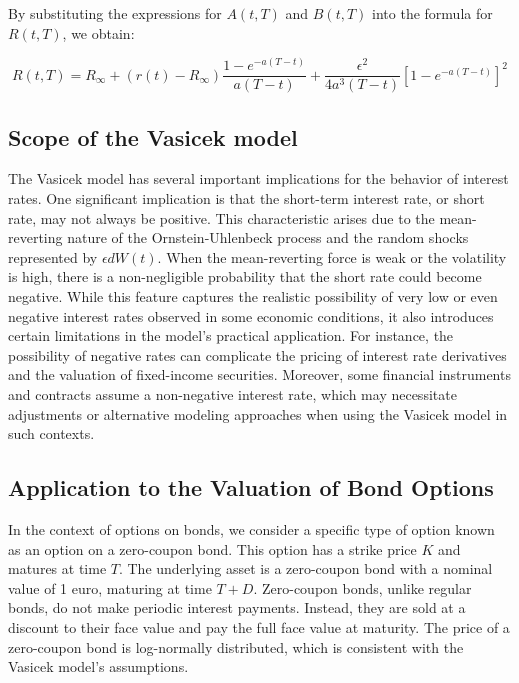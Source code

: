 \documentclass[a4paper,10pt]{article}
\begin{document}
\noindent By substituting the expressions for \( A(t, T) \) and \( B(t, T) \) into the formula for \( R(t, T) \), we obtain: 

\[R(t, T) = R_\infty + (r(t) - R_\infty) \frac{1 - e^{-a(T-t)}}{a(T - t)} + \frac{\epsilon^2}{4a^3(T - t)} \left[1 - e^{-a(T-t)}\right]^2\]

\subsection{Scope of the Vasicek model}

\noindent The Vasicek model has several important implications for the behavior of interest rates. One significant implication is that the short-term interest rate, or short rate, may not always be positive. This characteristic arises due to the mean-reverting nature of the Ornstein-Uhlenbeck process and the random shocks represented by \( \epsilon dW(t) \). When the mean-reverting force is weak or the volatility is high, there is a non-negligible probability that the short rate could become negative. While this feature captures the realistic possibility of very low or even negative interest rates observed in some economic conditions, it also introduces certain limitations in the model's practical application. For instance, the possibility of negative rates can complicate the pricing of interest rate derivatives and the valuation of fixed-income securities. Moreover, some financial instruments and contracts assume a non-negative interest rate, which may necessitate adjustments or alternative modeling approaches when using the Vasicek model in such contexts. \\

\subsection{Application to the Valuation of Bond Options}

\noindent In the context of options on bonds, we consider a specific type of option known as an option on a zero-coupon bond. This option has a strike price \( K \) and matures at time \( T \). The underlying asset is a zero-coupon bond with a nominal value of 1 euro, maturing at time \( T + D \). Zero-coupon bonds, unlike regular bonds, do not make periodic interest payments. Instead, they are sold at a discount to their face value and pay the full face value at maturity. The price of a zero-coupon bond is log-normally distributed, which is consistent with the Vasicek model's assumptions.\\
\end{document}
